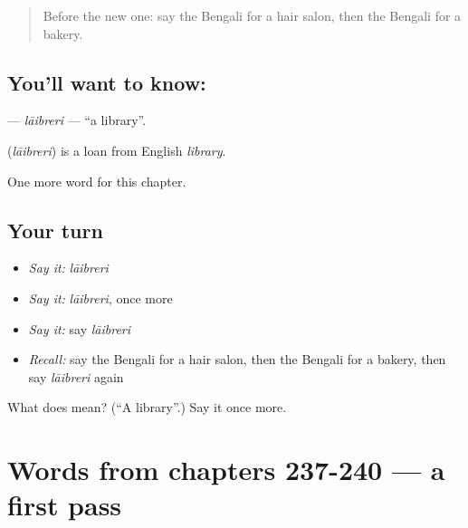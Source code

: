 \label{lesson:BN-C245-laibreri}



\begin{quote}
Before the new one: say the Bengali for a hair salon, then the Bengali for a bakery.
\end{quote}

\subsection*{You'll want to know: }
\textbf{} — \emph{lāibreri} — \textquotedblleft{}a library\textquotedblright{}.

\begin{cousinweb}
\textbf{} (\emph{lāibreri}) is a loan from English \emph{library}.
\end{cousinweb}

\begin{grammarlens}[title={What you've built}]
One more word for this chapter.
\end{grammarlens}

\subsection*{Your turn}
\begin{itemize}
\raggedright
  \item \emph{Say it:} \emph{lāibreri}
  \item \emph{Say it:} \emph{lāibreri}, once more
  \item \emph{Say it:} say \emph{lāibreri}
  \item \emph{Recall:} say the Bengali for a hair salon, then the Bengali for a bakery, then say \emph{lāibreri} again
\end{itemize}

\begin{tcolorbox}[breakable,colback=teal!4,colframe=teal!35!black,title={Before you move on}]
What does  mean? (\textquotedblleft{}A library\textquotedblright{}.) Say it once more.
\end{tcolorbox}
\section[(dialogue)]{Words from chapters 237-240 — a first pass}

\label{lesson:BN-R245-first-pass-words-from-chapters-237-240}



